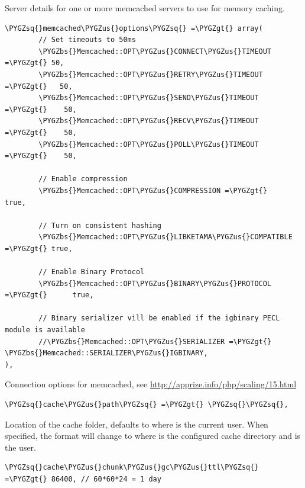\documentclass[letterpaper,10pt,english]{sphinxmanual}
\def\PYGZbs{\char`\\}
\def\PYGZus{\char`\_}
\def\PYGZgt{\char`\>}
\def\PYGZsq{\char`\'}
\renewcommand\PYGZsq{\textquotesingle}
\begin{document}
Server details for one or more memcached servers to use for memory caching.

\begin{Verbatim}[commandchars=\\\{\}]
\PYGZsq{}memcached\PYGZus{}options\PYGZsq{} =\PYGZgt{} array(
        // Set timeouts to 50ms
        \PYGZbs{}Memcached::OPT\PYGZus{}CONNECT\PYGZus{}TIMEOUT =\PYGZgt{} 50,
        \PYGZbs{}Memcached::OPT\PYGZus{}RETRY\PYGZus{}TIMEOUT =\PYGZgt{}   50,
        \PYGZbs{}Memcached::OPT\PYGZus{}SEND\PYGZus{}TIMEOUT =\PYGZgt{}    50,
        \PYGZbs{}Memcached::OPT\PYGZus{}RECV\PYGZus{}TIMEOUT =\PYGZgt{}    50,
        \PYGZbs{}Memcached::OPT\PYGZus{}POLL\PYGZus{}TIMEOUT =\PYGZgt{}    50,

        // Enable compression
        \PYGZbs{}Memcached::OPT\PYGZus{}COMPRESSION =\PYGZgt{}          true,

        // Turn on consistent hashing
        \PYGZbs{}Memcached::OPT\PYGZus{}LIBKETAMA\PYGZus{}COMPATIBLE =\PYGZgt{} true,

        // Enable Binary Protocol
        \PYGZbs{}Memcached::OPT\PYGZus{}BINARY\PYGZus{}PROTOCOL =\PYGZgt{}      true,

        // Binary serializer vill be enabled if the igbinary PECL module is available
        //\PYGZbs{}Memcached::OPT\PYGZus{}SERIALIZER =\PYGZgt{} \PYGZbs{}Memcached::SERIALIZER\PYGZus{}IGBINARY,
),
\end{Verbatim}

Connection options for memcached, see \href{http://apprize.info/php/scaling/15.html}{http://apprize.info/php/scaling/15.html}

\begin{Verbatim}[commandchars=\\\{\}]
\PYGZsq{}cache\PYGZus{}path\PYGZsq{} =\PYGZgt{} \PYGZsq{}\PYGZsq{},
\end{Verbatim}

Location of the cache folder, defaults to  where
 is the current user. When specified, the format will change to
 where  is the configured cache directory
and  is the user.

\begin{Verbatim}[commandchars=\\\{\}]
\PYGZsq{}cache\PYGZus{}chunk\PYGZus{}gc\PYGZus{}ttl\PYGZsq{} =\PYGZgt{} 86400, // 60*60*24 = 1 day
\end{Verbatim}
\end{document}
